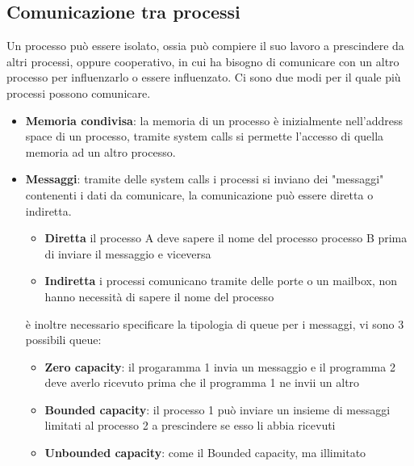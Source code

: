 \documentclass{article}
\begin{document}
    \subsection{Comunicazione tra processi}
            Un processo può essere isolato, ossia può compiere il suo lavoro a prescindere da altri processi, oppure cooperativo, in cui ha bisogno di comunicare con un altro processo per influenzarlo o essere influenzato.
            Ci sono due modi per il quale più processi possono comunicare.
            \begin{itemize}
                \item \textbf{Memoria condivisa}:
                    la memoria di un processo è inizialmente nell'address space di un processo, tramite system calls si permette l'accesso di quella memoria ad un altro processo.
                    
                \item \textbf{Messaggi}:
                    tramite delle system calls i processi si inviano dei "messaggi" contenenti i dati da comunicare, la comunicazione può essere diretta o indiretta.
                    \begin{itemize}
                        \item \textbf{Diretta} il processo A deve sapere il nome del processo processo B prima di inviare il messaggio e viceversa
                        \item \textbf{Indiretta} i processi comunicano tramite delle porte o un mailbox, non hanno necessità di sapere il nome del processo
                    \end{itemize}
                    è inoltre necessario specificare la tipologia di queue per i messaggi, vi sono 3 possibili queue:
                    \begin{itemize}
                        \item \textbf{Zero capacity}:
                            il progaramma 1 invia un messaggio e il programma 2 deve averlo ricevuto prima che il programma 1 ne invii un altro
                        \item \textbf{Bounded capacity}:
                            il processo 1 può inviare un insieme di messaggi limitati al processo 2 a prescindere se esso li abbia ricevuti
                        \item \textbf{Unbounded capacity}:
                            come il Bounded capacity, ma illimitato
                    \end{itemize}
            \end{itemize}
\end{document}
